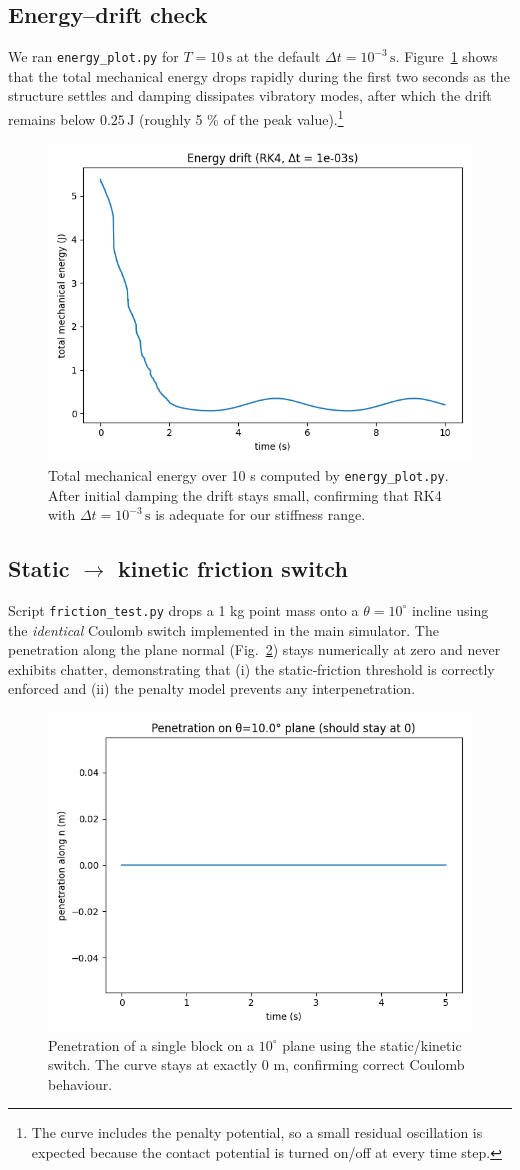 \documentclass[12pt,letterpaper]{article}
\begin{document}
\subsection{Energy–drift check}
We ran \texttt{energy\_plot.py} for \(T=10\,\text{s}\) at the default
\(\Delta t=10^{-3}\,\text{s}\).
Figure~\ref{fig:energy‑drift} shows that the total mechanical energy
drops rapidly during the first two seconds as the structure settles and
damping dissipates vibratory modes, after which the drift remains below
\(0.25\,\text{J}\) (roughly 5 \% of the peak value).\footnote{The curve
includes the penalty potential, so a small residual oscillation is
expected because the contact potential is turned on/off at every time
step.}

\begin{figure}[H]
    \centering
    \includegraphics[width=0.48\linewidth]{energy_drift.png}
    \caption{Total mechanical energy over 10 s computed by
      \texttt{energy\_plot.py}.  After initial damping the drift stays
      small, confirming that RK4 with \(\Delta t=10^{-3}\,\text{s}\) is
      adequate for our stiffness range.}
    \label{fig:energy‑drift}
\end{figure}

\subsection{Static $\rightarrow$ kinetic friction switch}
Script \texttt{friction\_test.py} drops a 1 kg point mass onto a
\(\theta=10^{\circ}\) incline using the \emph{identical} Coulomb switch
implemented in the main simulator.  
The penetration along the plane normal (Fig.~\ref{fig:friction‑penetr})
stays numerically at zero and never exhibits chatter, demonstrating that
(i) the static‐friction threshold is correctly enforced and  
(ii) the penalty model prevents any interpenetration.

\begin{figure}[H]
    \centering
    \includegraphics[width=0.48\linewidth]{friction_test.png}
    \caption{Penetration of a single block on a \(10^{\circ}\) plane
      using the static/kinetic switch.  The curve stays at exactly 0 m,
      confirming correct Coulomb behaviour.}
    \label{fig:friction‑penetr}
\end{figure}
\end{document}
